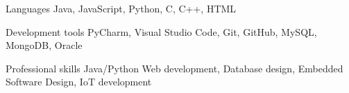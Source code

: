 
\begin{cvskills}
  \cvskill
    {Languages} %
    {Java, JavaScript, Python, C, C++, HTML} %

  
  \cvskill
    {Development tools} %
    {PyCharm, Visual Studio Code, Git, GitHub, MySQL, MongoDB, Oracle} %
    
  \cvskill
    {Professional skills}
    {Java/Python Web development, Database design, Embedded Software Design, IoT development}
    

\end{cvskills}
